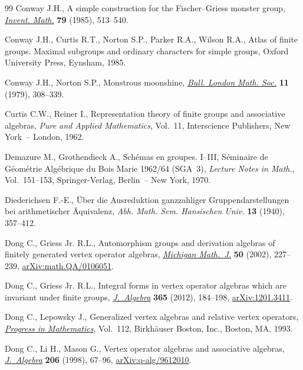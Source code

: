 \documentclass[pdftex]{sigma}
\theoremstyle{definition}
\begin{document}
\begin{thebibliography}{99}
Conway J.H., A simple construction for the {F}ischer--{G}riess monster group,
 \href{https://doi.org/10.1007/BF01388521}{\textit{Invent. Math.}} \textbf{79} (1985), 513--540.

Conway J.H., Curtis R.T., Norton S.P., Parker R.A., Wilson R.A., Atlas of
 finite groups. Maximal subgroups and ordinary characters for simple groups,
 Oxford University Press, Eynsham, 1985.

Conway J.H., Norton S.P., Monstrous moonshine, \href{https://doi.org/10.1112/blms/11.3.308}{\textit{Bull. London Math. Soc.}}
 \textbf{11} (1979), 308--339.

Curtis C.W., Reiner I., Representation theory of finite groups and associative
 algebras, \textit{Pure and Applied Mathematics}, Vol.~11, Interscience
 Publishers, New York~-- London, 1962.

Demazure M., Grothendieck A., Sch\'{e}mas en groupes. {I}--{III},
 {S}\'{e}minaire de G\'{e}om\'{e}trie Alg\'{e}brique du Bois Marie 1962/64
 (SGA~3), \textit{Lecture Notes in Math.}, Vol.~151--153, Springer-Verlag,
 Berlin~-- New York, 1970.

Diederichsen F.-E., \"{U}ber die {A}usreduktion ganzzahliger
 {G}ruppendarstellungen bei arithmetischer \"{A}quivalenz, \textit{Abh. Math.
 Sem. Hansischen Univ.} \textbf{13} (1940), 357--412.

Dong C., Griess Jr. R.L., Automorphism groups and derivation algebras of
 finitely generated vertex operator algebras, \href{https://doi.org/10.1307/mmj/1028575732}{\textit{Michigan Math.~J.}}
 \textbf{50} (2002), 227--239, \href{https://arxiv.org/abs/math.QA/0106051}{arXiv:math.QA/0106051}.

Dong C., Griess Jr. R.L., Integral forms in vertex operator algebras which are
 invariant under finite groups, \href{https://doi.org/10.1016/j.jalgebra.2012.05.006}{\textit{J.~Algebra}} \textbf{365} (2012),
 184--198, \href{https://arxiv.org/abs/1201.3411}{arXiv:1201.3411}.

Dong C., Lepowsky J., Generalized vertex algebras and relative vertex
 operators, \href{https://doi.org/10.1007/978-1-4612-0353-7}{\textit{Progress in Mathematics}}, Vol.~112, Birkh\"{a}user Boston,
 Inc., Boston, MA, 1993.

Dong C., Li H., Mason G., Vertex operator algebras and associative algebras,
 \href{https://doi.org/10.1006/jabr.1998.7425}{\textit{J.~Algebra}} \textbf{206} (1998), 67--96, \href{https://arxiv.org/abs/q-alg/9612010}{arXiv:q-alg/9612010}.


\end{thebibliography}
\end{document}
